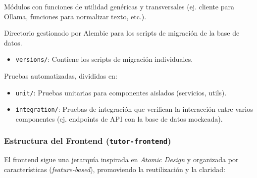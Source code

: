 \begin{description}[leftmargin=*,style=unboxed,font=\normalfont]
  \item[\texttt{src/utils/}] Módulos con funciones de utilidad genéricas y transversales (ej. cliente para Ollama, funciones para normalizar texto, etc.).
  \item[\texttt{migrations/}] Directorio gestionado por Alembic para los scripts de migración de la base de datos.
    \begin{itemize}
        \item \texttt{versions/}: Contiene los scripts de migración individuales.
    \end{itemize}
  \item[\texttt{tests/}] Pruebas automatizadas, divididas en:
    \begin{itemize}
        \item \texttt{unit/}: Pruebas unitarias para componentes aislados (servicios, utils).
        \item \texttt{integration/}: Pruebas de integración que verifican la interacción entre varios componentes (ej. endpoints de API con la base de datos mockeada).
    \end{itemize}
\end{description}

\subsubsection*{Estructura del Frontend (\texttt{tutor-frontend})}
\label{sssec:desarrollo_arch_frontend}

El frontend sigue una jerarquía inspirada en \emph{Atomic Design} y organizada por características (\emph{feature-based}), promoviendo la reutilización y la claridad:

